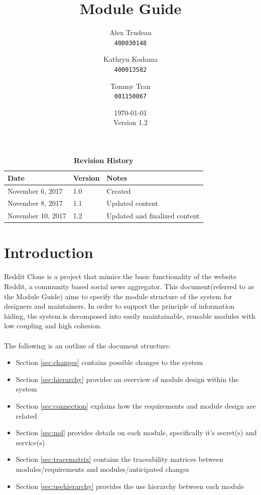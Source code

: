 \documentclass[12pt,fleqn]{article}
\title{Module Guide}
\author{
Alex Trudeau\\
	\texttt{400030148}
\and
Kathryn Kodama\\
  	\texttt{400013582}
\and
Tommy Tran\\
	\texttt{001150067}
}
\date{\today\\ Version 1.2}
\begin{document}
\maketitle

\pagebreak

\tableofcontents
\listoftables
\listoffigures
\begin{table}[ht]
\caption{\bf Revision History}
\begin{tabularx}{\textwidth}{p{3cm}p{2cm}X}
\toprule {\bf Date} & {\bf Version} & {\bf Notes}\\
\midrule
November 6, 2017 & 1.0 & Created\\
November 8, 2017 & 1.1 & Updated content\\
November 10, 2017 & 1.2 & Updated and finalized content \\
\bottomrule
\end{tabularx}
\end{table}


\pagebreak


\section{Introduction}
Reddit Clone is a project that mimics the basic functionality of the website Reddit, a community based social news aggregator. This document(referred to as the Module Guide) aims to specify the module structure of the system for designers and maintainers. In order to support the principle of information hiding, the system is decomposed into easily maintainable, reusable modules with low coupling and high cohesion.\\
\\
The following is an outline of the document structure:
\begin{itemize}
    \item Section \ref{sec:changes} contains possible changes to the system
    \item Section \ref{sec:hierarchy} provides an overview of module design within the system
    \item Section \ref{sec:connection} explains how the requirements and module design are related
    \item Section \ref{sec:md} provides details on each module, specifically it's  secret(s) and service(s)
    \item Section \ref{sec:tracematrix} contains the traceability matrices between modules/requirements and modules/anticipated changes
    \item Section \ref{sec:usehierarchy} provides the use hierarchy between each module
    
\end{itemize}
\end{document}
